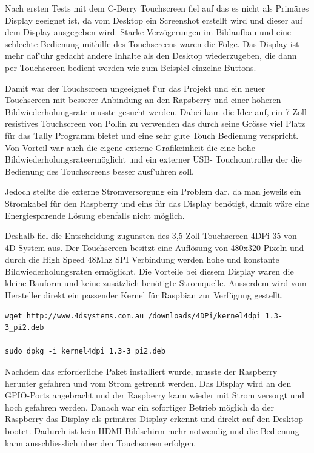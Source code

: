 \documentclass[11pt,a4paper]{article} %
\begin{document}
Nach ersten Tests mit dem C-Berry Touchscreen fiel auf das es nicht als Prim\"ares Display geeignet ist, da vom Desktop ein Screenshot erstellt wird und dieser auf dem Display ausgegeben wird. Starke Verz\"ogerungen im Bildaufbau und eine schlechte Bedienung mithilfe des Touchscreens waren die Folge. Das Display ist mehr daf\''uhr gedacht andere Inhalte als den Desktop wiederzugeben, die dann per Touchscreen bedient werden wie zum Beispiel einzelne Buttons.
\par
Damit war der Touchscreen ungeeignet f\''ur das Projekt und ein neuer Touchscreen mit besserer Anbindung an den Rapsberry und einer h\"oheren Bildwiederholungsrate musste gesucht werden. Dabei kam die Idee auf, ein 7 Zoll resistives Touchscreen von Pollin zu verwenden das durch seine Gr\"osse viel Platz f\"ur das Tally Programm bietet und eine sehr gute Touch Bedienung verspricht. Von Vorteil war auch die eigene externe Grafikeinheit die eine hohe Bildwiederholungsrateerm\"oglicht  und ein externer USB- Touchcontroller der die Bedienung des Touchscreens besser ausf\''uhren soll.
\par
Jedoch stellte die externe Stromversorgung ein Problem dar, da man jeweils ein Stromkabel f\"ur den Raspberry und eins f\"ur das Display ben\"otigt, damit w\"are eine Energiesparende L\"osung ebenfalls nicht m\"oglich.
\par
Deshalb fiel die Entscheidung zugunsten des 3,5 Zoll Touchscreen 4DPi-35 von 4D System aus.\cite{berry6} Der Touchscreen besitzt eine Aufl\"osung von 480x320 Pixeln und durch die High Speed 48Mhz SPI Verbindung werden hohe und konstante Bildwiederholungsraten erm\"oglicht.
Die Vorteile bei diesem Display waren die kleine Bauform und keine zus\"atzlich ben\"otigte Stromquelle. Ausserdem wird vom Hersteller direkt ein passender Kernel f\"ur Raspbian zur Verf\"ugung gestellt.
\begin{frame}

\begin{lstlisting}
wget http://www.4dsystems.com.au /downloads/4DPi/kernel4dpi_1.3-3_pi2.deb 

sudo dpkg -i kernel4dpi_1.3-3_pi2.deb
\end{lstlisting}

\end{frame}

 Nachdem das erforderliche Paket installiert wurde, musste der Raspberry herunter gefahren und vom Strom getrennt werden. Das Display wird an den GPIO-Ports angebracht und der Raspberry kann wieder mit Strom versorgt und hoch gefahren werden. Danach war ein sofortiger Betrieb m\"oglich da der Raspberry das Display als primäres Display erkennt und direkt auf den Desktop bootet. Dadurch ist kein HDMI Bildschirm mehr notwendig und die Bedienung kann ausschliesslich \"uber den Touchscreen erfolgen.
\par
\end{document}
